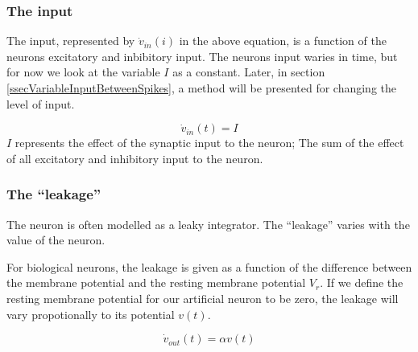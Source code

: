 \subsubsection{The input}
The input, represented by $\dot{v}_{in}(i)$ in the above equation, is a function of the neurons excitatory and inbibitory input. 
The neurons input waries in time, but for now we look at the variable $I$ as a constant.
Later, in section \ref{ssecVariableInputBetweenSpikes}, a method will be presented for changing the level of input.  %

\begin{equation}
	\dot{v}_{in}(t) = I
\end{equation}
$I$ represents the effect of the synaptic input to the neuron; 
	The sum of the effect of all excitatory and inhibitory input to the neuron.



\subsubsection{The ``leakage''}
The neuron is often modelled as a leaky integrator. 
The ``leakage'' varies with the value of the neuron. %

For biological neurons, the leakage is given as a function of the difference between the membrane potential and the resting membrane potential $V_r$. 
If we define the resting membrane potential for our artificial neuron to be zero, the leakage will vary propotionally to its potential $v(t)$.

\begin{equation}
	\dot{v}_{out}(t) = \alpha v(t)
\end{equation}

